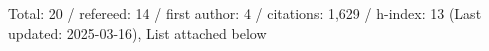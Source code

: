 Total: 20 / refereed: 14 / first author: 4 / citations: 1,629 / h-index: 13 (Last updated: 2025-03-16), List attached below